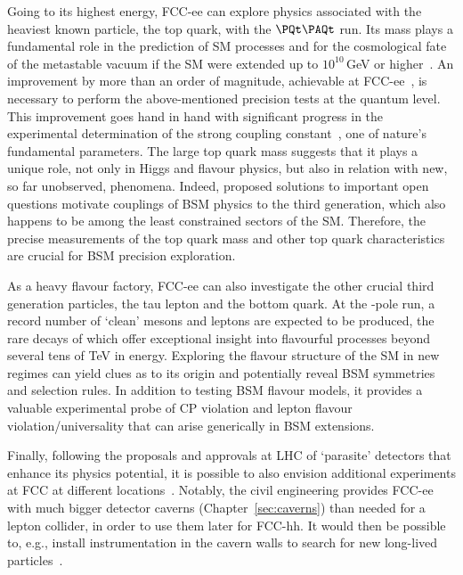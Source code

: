 Going to its highest energy, FCC-ee can explore physics associated with the heaviest known particle, the top quark, 
with the $\ttbar$ run. 
Its mass plays a fundamental role in the prediction of SM processes 
and for the cosmological fate of the metastable vacuum if the SM were extended up to $10^{10}$\,GeV 
or higher~\cite{Degrassi:2012ry,Buttazzo:2013uya,Bednyakov:2015sca,Andreassen:2017rzq}. 
An improvement by more than an order of magnitude, achievable at FCC-ee~\cite{defranchis_2024_cqd16-xhk71}, 
is necessary to perform the above-mentioned precision tests at the quantum level. 
This improvement goes hand in hand with significant progress in the experimental determination 
of the strong coupling constant~\cite{dEnterria:2022hzv}, one of nature's fundamental parameters. 
The large top quark mass suggests that it plays a unique role, 
not only in Higgs and flavour physics, but also in relation with new, so far unobserved, phenomena. 
Indeed, proposed solutions to important open questions motivate couplings of BSM physics to the third generation, 
which also happens to be among the least constrained sectors of the SM. 
Therefore, the precise measurements of the top quark mass and other top quark characteristics 
are crucial for BSM precision exploration.

As a heavy flavour factory, FCC-ee can also investigate the other crucial third generation particles, 
the tau lepton and the bottom quark. 
At the \PZ-pole run, a record number of `clean' \PB mesons and \PGt leptons are expected to be produced, 
the rare decays of which offer exceptional insight into flavourful processes beyond several tens of TeV in energy. 
Exploring the flavour structure of the SM in new regimes can yield clues as to its origin 
and potentially reveal BSM symmetries and selection rules. 
In addition to testing BSM flavour models, 
it provides a valuable experimental probe of CP violation and lepton flavour violation/universality 
that can arise generically in BSM extensions.

Finally, following the proposals and approvals at LHC of `parasite' detectors that enhance its physics potential, 
it is possible to also envision additional experiments at FCC at different locations~\cite{Wang:2019xvx,Tian:2022rsi, Lu:2024fxs}. 
Notably, the civil engineering provides FCC-ee with much bigger detector caverns (Chapter~\ref{sec:caverns}) 
than needed for a lepton collider, in order to use them later for FCC-hh. 
It would then be possible to, e.g., 
install instrumentation in the cavern walls to search for new long-lived particles~\cite{Chrzaszcz:2020emg}. 

